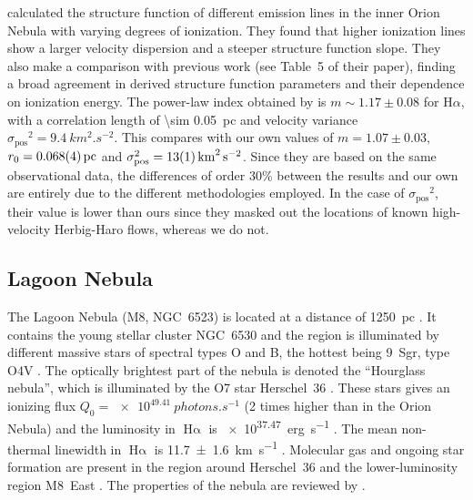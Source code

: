 \documentclass[fleqn,usenatbib, useAMS, a4paper]{mnras}
\newcommand\startNEW{\color{NEWcolor}}
\newcommand\stopNEW{\color{black}}
\newcommand\pos{\ensuremath{_{\mathrm{pos}}}}
\newcommand\halpha{H${\alpha}$}
\newcommand\ha{\ensuremath{\text{H}\upalpha}}
\begin{document}
\citet{arthur2016turbulence}
\startNEW
calculated the structure function of different emission lines in the inner Orion Nebula with varying degrees of ionization.
They found that higher ionization lines show a larger velocity dispersion
and a steeper structure function slope.
\stopNEW
They also make a comparison with previous work (see Table~5 of their paper), finding a broad
\startNEW
agreement in derived structure function parameters
and their dependence on ionization energy.
\stopNEW
The power-law index obtained by \citet{arthur2016turbulence} is
\startNEW
\(m \sim 1.17 \pm 0.08\) for \halpha,
with a correlation length of \SI{\sim 0.05}{pc} and velocity variance
\(\sigma\pos^2= \SI{9.4}{km^{2 }.s^{-2}}\).
This compares with our own values of
\(m = 1.07 \pm 0.03\), \(r_0 = \SI{0.068 \pm 0.004}{pc}\)
and \(\sigma\pos^2 = \SI{13 \pm 1}{ km^{2}.s^{-2}}\). 
Since they are based on the same observational data,
the differences of order 30\% between the \citet{arthur2016turbulence}
results and our own are entirely due to the different methodologies employed.
In the case of \(\sigma\pos^2\), their value is lower than ours since
they masked out the locations of known high-velocity Herbig-Haro flows, whereas we do not.
\stopNEW

\startNEW
\subsection{Lagoon Nebula}
\label{sec:lagoon-nebula}
\stopNEW

The Lagoon Nebula (M8, NGC~6523) is located at a distance of \SI{1250}{pc}  \citetext{\SI{1}{\arcsecond} = \SI{0.006}{pc} ; \citealp{2005A&A...430..941P}}.
It contains the young stellar cluster NGC~6530 and the region is illuminated by different massive stars of spectral types O and B, the hottest being 9~Sgr, type O4V \citep{Damiani:2017b}.
\startNEW
The optically brightest part of the nebula is denoted the ``Hourglass nebula'',
which is illuminated by the O7 star Herschel~36 \citep{1986AJ.....91..870W}.
\stopNEW
These stars gives an ionizing flux \(Q_0 = \SI{e49.41}{photons.s^{-1}}\) (2 times higher than in the Orion Nebula) and the luminosity in \ha{} is \SI{e37.47}{erg.s^{-1}} \citep{1984ApJ...287..116K}.
The mean non-thermal linewidth in \ha{} is \SI{11.7 \pm 1.6}{km.s^{-1}} \citep{1973ApJ...183..851B}.
\startNEW
Molecular gas and ongoing star formation are present in the region around
Herschel~36 \citep{Arias:2006e, Tiwari:2018a} and the lower-luminosity region
M8~East \citep{1984ApJ...278..170S, Tiwari:2020a}.
\stopNEW
The properties of the nebula are reviewed by \citet{2008hsf2.book..533T}.
\end{document}
